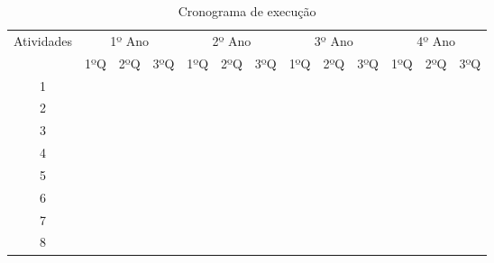 \documentclass[12pt]{article}
\begin{document}
\begin{table}[htbp]
	\centering
	\caption{Cronograma de execução}
		\begin{tabular}{|c|p{0.6cm}|p{0.6cm}|p{0.6cm}|p{0.6cm}|p{0.6cm}|p{0.6cm}|p{0.6cm}|p{0.6cm}|p{0.6cm}|p{0.6cm}|p{0.6cm}|p{0.6cm}|}
		\hline
		\multicolumn{ 1}{|c|}{Atividades} &        \multicolumn{ 3}{|c|}{1º Ano} &        \multicolumn{ 3}{|c|}{2º Ano} &        \multicolumn{ 3}{|c|}{3º Ano} &        \multicolumn{ 3}{|c|}{4º Ano} \\

	  
		\multicolumn{ 1}{|c|}{} &   1ºQ  &   2ºQ  &   3ºQ  &   1ºQ  &   2ºQ  &   3ºQ  &   1ºQ  &   2ºQ  &   3ºQ  &   1ºQ  &   2ºQ  &   3ºQ   \\
		\hline 
    \multicolumn{ 1}{|c|}{1}              &\cellcolor{black}&\cellcolor{black}&\cellcolor{black}&	        &         &         &         &         &         &         &         &           \\
		\hline
    \multicolumn{ 1}{|c|}{2}              &         &         &         &\cellcolor{black}&         &         &         &         &         &         &         &           \\
		\hline
    \multicolumn{ 1}{|c|}{3}              &         &         &         &\cellcolor{black}&\cellcolor{black}&\cellcolor{black}&\cellcolor{black}&         &         &         &         &            \\
		\hline
    \multicolumn{ 1}{|c|}{4}              &         &         &         &         &\cellcolor{black}&         &         &         &         &         &         &            \\
		\hline
    \multicolumn{ 1}{|c|}{5}              &         &         &         &         &\cellcolor{black}&         &         &         &         &         &         &            \\
		\hline
    \multicolumn{ 1}{|c|}{6}              &         &         &         &         &\cellcolor{black}&         &         &         &         &         &         &            \\
		\hline
    \multicolumn{ 1}{|c|}{7}              &         &         &         &					&\cellcolor{black}&         &         &         &         &         &         &            \\
		\hline
    \multicolumn{ 1}{|c|}{8}              &         &         &         &         &         &\cellcolor{black}&\cellcolor{black}&\cellcolor{black}&         &         &         &            \\
		\hline

\end{tabular}
\end{table}
\end{document}

